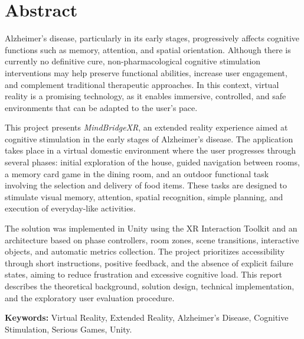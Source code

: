 \documentclass[12pt,a4paper,oneside]{report}
\newcommand{\blankpage}{
    \clearpage
    \thispagestyle{empty}
    \null
    \clearpage
}
\begin{document}
\blankpage

\chapter*{Abstract}

Alzheimer's disease, particularly in its early stages, progressively affects cognitive functions such as memory, attention, and spatial orientation. Although there is currently no definitive cure, non-pharmacological cognitive stimulation interventions may help preserve functional abilities, increase user engagement, and complement traditional therapeutic approaches. In this context, virtual reality is a promising technology, as it enables immersive, controlled, and safe environments that can be adapted to the user's pace.

This project presents \textit{MindBridgeXR}, an extended reality experience aimed at cognitive stimulation in the early stages of Alzheimer's disease. The application takes place in a virtual domestic environment where the user progresses through several phases: initial exploration of the house, guided navigation between rooms, a memory card game in the dining room, and an outdoor functional task involving the selection and delivery of food items. These tasks are designed to stimulate visual memory, attention, spatial recognition, simple planning, and execution of everyday-like activities.

The solution was implemented in Unity using the XR Interaction Toolkit and an architecture based on phase controllers, room zones, scene transitions, interactive objects, and automatic metrics collection. The project prioritizes accessibility through short instructions, positive feedback, and the absence of explicit failure states, aiming to reduce frustration and excessive cognitive load. This report describes the theoretical background, solution design, technical implementation, and the exploratory user evaluation procedure.

\textbf{Keywords:} Virtual Reality, Extended Reality, Alzheimer's Disease, Cognitive Stimulation, Serious Games, Unity.

\blankpage

\tableofcontents

\blankpage

\listoffigures

\blankpage
\end{document}
